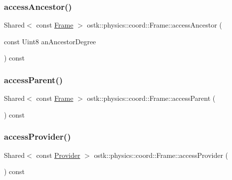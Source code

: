 \subsubsection{\texorpdfstring{access\+Ancestor()}{accessAncestor()}}
{\footnotesize\ttfamily Shared$<$ const \hyperlink{classostk_1_1physics_1_1coord_1_1_frame}{Frame} $>$ ostk\+::physics\+::coord\+::\+Frame\+::access\+Ancestor (\begin{DoxyParamCaption}\item[{const Uint8}]{an\+Ancestor\+Degree }\end{DoxyParamCaption}) const}

\mbox{\label{classostk_1_1physics_1_1coord_1_1_frame_a549b54435e1a47193ff7288df9d2b0cb}} 
\subsubsection{\texorpdfstring{access\+Parent()}{accessParent()}}
{\footnotesize\ttfamily Shared$<$ const \hyperlink{classostk_1_1physics_1_1coord_1_1_frame}{Frame} $>$ ostk\+::physics\+::coord\+::\+Frame\+::access\+Parent (\begin{DoxyParamCaption}{ }\end{DoxyParamCaption}) const}

\mbox{\label{classostk_1_1physics_1_1coord_1_1_frame_a60c1717e04993577c0dcf4eae23be672}} 
\subsubsection{\texorpdfstring{access\+Provider()}{accessProvider()}}
{\footnotesize\ttfamily Shared$<$ const \hyperlink{classostk_1_1physics_1_1coord_1_1frame_1_1_provider}{Provider} $>$ ostk\+::physics\+::coord\+::\+Frame\+::access\+Provider (\begin{DoxyParamCaption}{ }\end{DoxyParamCaption}) const}

